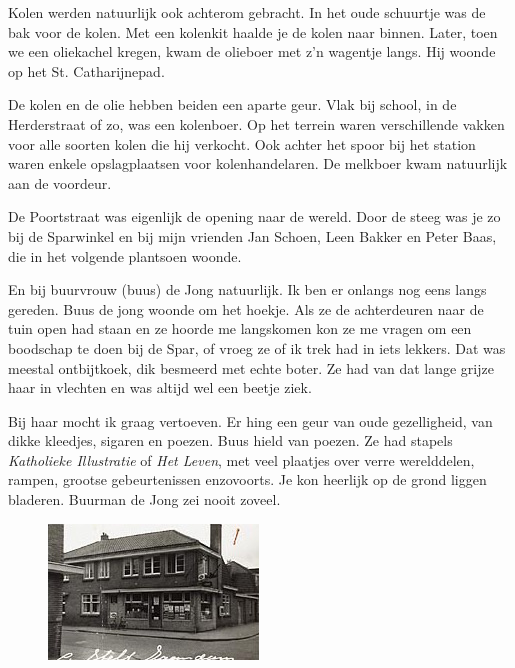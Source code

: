 \documentclass[12pt,twoside]{memoir}
\begin{document}
Kolen werden natuurlijk ook achterom gebracht. In het oude schuurtje was de bak voor de kolen. Met een kolenkit haalde je de kolen naar binnen. Later, toen we een oliekachel kregen, kwam de olieboer met z’n wagentje langs. Hij woonde op het St. Catharijnepad.

De kolen en de olie hebben beiden een aparte geur. Vlak bij school, in de Herderstraat of zo, was een kolenboer. Op het terrein waren verschillende vakken voor alle soorten kolen die hij verkocht. Ook achter het spoor bij het station waren enkele opslagplaatsen voor kolenhandelaren. De melkboer kwam natuurlijk aan de voordeur.

De Poortstraat was eigenlijk de opening naar de wereld. Door de steeg was je zo bij de Sparwinkel en bij mijn vrienden Jan Schoen, Leen Bakker en Peter Baas, die in het volgende plantsoen woonde. 

En bij buurvrouw (buus) de Jong natuurlijk. Ik ben er onlangs nog eens langs gereden. Buus de jong woonde om het hoekje. Als ze de achterdeuren naar de tuin open had staan en ze hoorde me langskomen kon ze me vragen om een boodschap te doen bij de Spar, of vroeg ze of ik trek had in iets lekkers. Dat was meestal ontbijtkoek, dik besmeerd met echte boter. Ze had van dat lange grijze haar in vlechten en was altijd wel een beetje ziek.

Bij haar mocht ik graag vertoeven. Er hing een geur van oude gezelligheid, van dikke kleedjes, sigaren en poezen. Buus hield van poezen. Ze had stapels \emph{Katholieke Illustratie} of \emph{Het Leven}, met veel plaatjes over verre werelddelen, rampen, grootse gebeurtenissen enzovoorts. Je kon heerlijk op de grond liggen bladeren. Buurman de Jong zei nooit zoveel. 

\begin{figure}
\includegraphics[width=\textwidth]{img/ch5/Spar-Poortstr}
\caption*{\footnotesize }
\end{figure}
\end{document}
